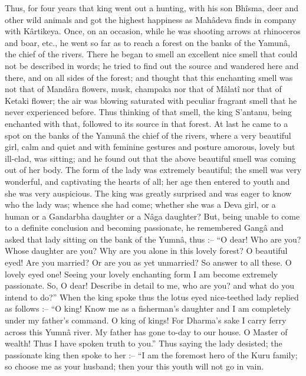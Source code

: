 Thus, for four years that king went out a hunting, with his son Bhîsma, deer and other wild animals and got the highest happiness as Mahâdeva finds in company with Kârtikeya. Once, on an occasion, while he was shooting arrows at rhinoceros and boar, etc., he went so far as to reach a forest on the banks of the Yamunâ, the chief of the rivers. There he began to smell an excellent nice smell that could not be described in words; he tried to find out the source and wandered here and there, and on all sides of the forest; and thought that this enchanting smell was not that of Mandâra flowers, musk, champaka nor that of Mâlatî nor that of Ketaki flower; the air was blowing saturated with peculiar fragrant smell that he never experienced before. Thus thinking of that smell, the king S’antanu, being enchanted with that, followed to its source in that forest. At last he came to a spot on the banks of the Yamunâ the chief of the rivers, where a very beautiful girl, calm and quiet and with feminine gestures and posture amorous, lovely but ill-clad, was sitting; and he found out that the above beautiful smell was coming out of her body. The form of the lady was extremely beautiful; the smell was very wonderful, and captivating the hearts of all; her age then entered to youth and she was very auspicious. The king was greatly surprised and was eager to know who the lady was; whence she had come; whether she was a Deva girl, or a human or a Gandarbha daughter or a Nâga daughter? But, being unable to come to a definite conclusion and becoming passionate, he remembered Gangâ and asked that lady sitting on the bank of the Yumnâ, thus :-- “O dear! Who are you? Whose daughter are you? Why are you alone in this lovely forest? O beautiful eyed! Are you married? Or are you as yet unmarried? So answer to all these. O lovely eyed one!  Seeing your lovely enchanting form I am become extremely passionate. So, O dear! Describe in detail to me, who are you? and what do you intend to do?” When the king spoke thus the lotus eyed nice-teethed lady replied as follows :-- “O king! Know me as a fisherman's daughter and I am completely under my father's command. O king of kings! For Dharma's sake I carry ferry across this Yumnâ river. My father has gone to-day to our house. O Master of wealth! Thus I have spoken truth to you.” Thus saying the lady desisted; the passionate king then spoke to her :-- “I am the foremost hero of the Kuru family; so choose me as your husband; then your this youth will not go in vain.

 

